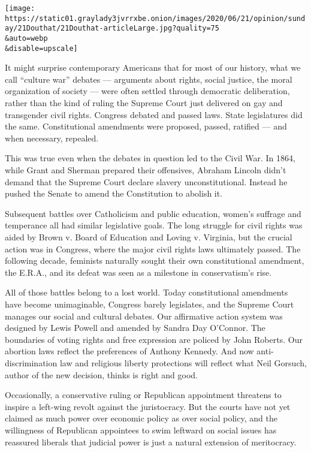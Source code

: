\texttt{[image: https://static01.graylady3jvrrxbe.onion/images/2020/06/21/opinion/sunday/21Douthat/21Douthat-articleLarge.jpg?quality=75\\\&auto=webp\\\&disable=upscale]}

It might surprise contemporary Americans that for most of our history,
what we call ``culture war'' debates --- arguments about rights, social
justice, the moral organization of society --- were often settled
through democratic deliberation, rather than the kind of ruling the
Supreme Court just delivered on gay and transgender civil rights.
Congress debated and passed laws. State legislatures did the same.
Constitutional amendments were proposed, passed, ratified --- and when
necessary, repealed.

This was true even when the debates in question led to the Civil War. In
1864, while Grant and Sherman prepared their offensives, Abraham Lincoln
didn't demand that the Supreme Court declare slavery unconstitutional.
Instead he pushed the Senate to amend the Constitution to abolish it.

Subsequent battles over Catholicism and public education, women's
suffrage and temperance all had similar legislative goals. The long
struggle for civil rights was aided by Brown v. Board of Education and
Loving v. Virginia, but the crucial action was in Congress, where the
major civil rights laws ultimately passed. The following decade,
feminists naturally sought their own constitutional amendment, the
E.R.A., and its defeat was seen as a milestone in conservatism's rise.

All of those battles belong to a lost world. Today constitutional
amendments have become unimaginable, Congress barely legislates, and the
Supreme Court manages our social and cultural debates. Our affirmative
action system was designed by Lewis Powell and amended by Sandra Day
O'Connor. The boundaries of voting rights and free expression are
policed by John Roberts. Our abortion laws reflect the preferences of
Anthony Kennedy. And now anti-discrimination law and religious liberty
protections will reflect what Neil Gorsuch, author of the new decision,
thinks is right and good.

Occasionally, a conservative ruling or Republican appointment threatens
to inspire a left-wing revolt against the juristocracy. But the courts
have not yet claimed as much power over economic policy as over social
policy, and the willingness of Republican appointees to swim leftward on
social issues has reassured liberals that judicial power is just a
natural extension of meritocracy.

